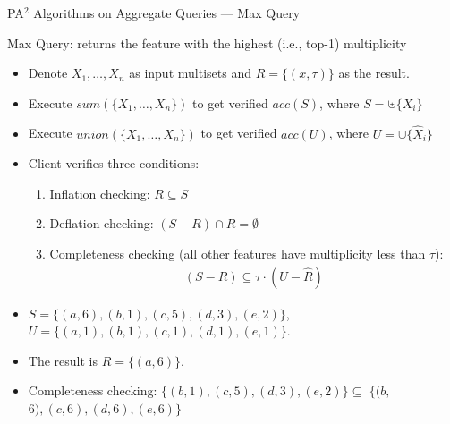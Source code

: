 \documentclass[xcolor={dvipsnames},aspectratio=169,10pt]{beamer}
\begin{document}
\begin{frame}{PA$^2$ Algorithms on Aggregate Queries --- Max Query}
  \begin{block}{Max Query: returns the feature with the highest (i.e., top-1) multiplicity}
    \begin{itemize}
      \item Denote $X_1, \dotsc, X_n$ as input multisets and $R = \{ (x, \tau) \}$ as the result.
      \item Execute $sum(\{X_1, \dotsc, X_n\})$ to get verified $acc(S)$, where $S = \uplus \{X_i\}$
      \item Execute $union(\{X_1, \dotsc, X_n\})$ to get verified $acc(U)$, where $U = \cup \{\widehat{X}_i\}$
      \item Client verifies three conditions:
        \begin{enumerate}
          \item \alert{Inflation checking}: $R \subseteq S$
          \item \alert{Deflation checking}: $(S - R) \cap R = \emptyset$
          \item \alert{Completeness checking} (all other features have multiplicity less than $\tau$):
            \begin{align*}
              (S - R) \subseteq \tau \cdot (U -\widehat{R})
            \end{align*}
        \end{enumerate}
    \end{itemize}
  \end{block}
  \begin{example}
    \begin{itemize}
      \item $S = \{(a,6), (b, 1), (c, 5), (d, 3), (e, 2)\}$, $U = \{(a, 1), (b, 1), (c, 1), (d, 1), (e, 1)\}$.
      \item The result is $R = \{(a, 6)\}$.
      \item \alert{Completeness checking}: $\{(b, 1), (c, 5), (d, 3), (e, 2)\} \subseteq $ $\{(b,$ $6), (c, 6), (d, 6), (e, 6)\}$
    \end{itemize}
  \end{example}
\end{frame}
\end{document}
